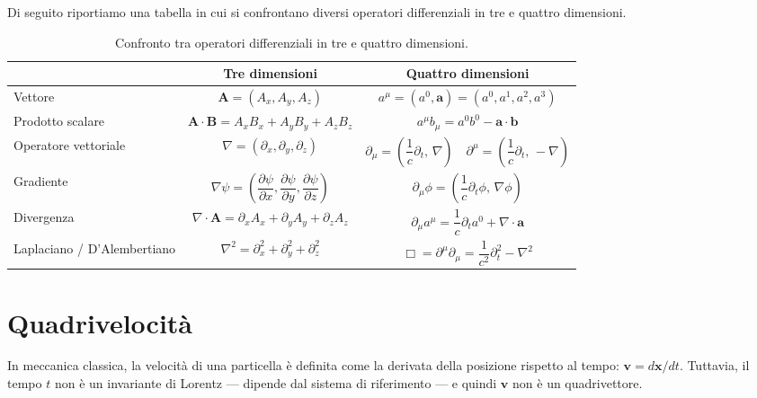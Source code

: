 Di seguito riportiamo una tabella in cui si confrontano diversi operatori differenziali in tre e quattro dimensioni.\\

\begin{table}[h]
\centering
\renewcommand{\arraystretch}{2.2}
\begin{tabular}{lcc}
\hline
& \textbf{Tre dimensioni} & \textbf{Quattro dimensioni} \\
\hline
Vettore & 
$\mathbf{A} = (A_x, A_y, A_z)$ & 
$a^\mu = (a^0, \mathbf{a}) = (a^0, a^1, a^2, a^3)$ \\

Prodotto scalare & 
$\mathbf{A}\cdot\mathbf{B} = A_xB_x + A_yB_y + A_zB_z$ & 
$a^\mu b_\mu = a^0b^0 - \mathbf{a}\cdot\mathbf{b}$ \\

Operatore vettoriale & 
$\nabla = \left(\partial_x, \partial_y, \partial_z\right)$ & 
$\partial_\mu = \left(\dfrac{1}{c}\partial_t,\, \nabla\right) \quad 
\partial^\mu = \left(\dfrac{1}{c}\partial_t,\, -\nabla\right)$ \\

Gradiente & 
$\nabla\psi = \left(\dfrac{\partial\psi}{\partial x}, 
\dfrac{\partial\psi}{\partial y}, 
\dfrac{\partial\psi}{\partial z}\right)$ & 
$\partial_\mu\phi = \left(\dfrac{1}{c}\partial_t\phi,\, 
\nabla\phi\right)$ \\

Divergenza & 
$\nabla\cdot\mathbf{A} = \partial_x A_x + \partial_y A_y + 
\partial_z A_z$ & 
$\partial_\mu a^\mu = \dfrac{1}{c}\partial_t a^0 + 
\nabla\cdot\mathbf{a}$ \\

Laplaciano / D'Alembertiano & 
$\nabla^2 = \partial_x^2 + \partial_y^2 + \partial_z^2$ & 
$\Box = \partial^\mu\partial_\mu = \dfrac{1}{c^2}\partial_t^2 - 
\nabla^2$ \\
\hline
\end{tabular}
\caption{Confronto tra operatori differenziali in tre e quattro 
dimensioni.}
\label{tab: operatori_3D_4D}
\end{table}

\newpage

\section{Quadrivelocità}

In meccanica classica, la velocità di una particella è definita come la derivata della posizione rispetto al tempo: $\mathbf{v} = d\mathbf{x}/dt$. Tuttavia, il tempo $t$ non è un invariante di Lorentz — dipende dal sistema di riferimento — e quindi $\mathbf{v}$ non è un quadrivettore.\\

